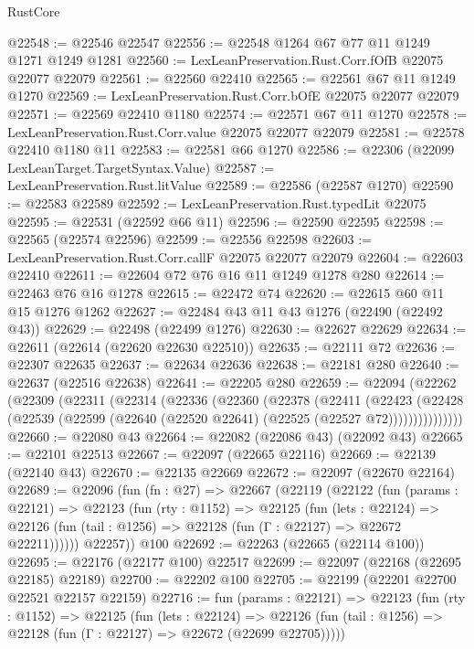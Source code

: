 \begin{lexlean}{RustCore}
\begin{coremodule}
@22548 := @22546 @22547
@22556 := @22548 @1264 @67 @77 @11 @1249 @1271 @1249 @1281
@22560 := LexLeanPreservation.Rust.Corr.fOfB @22075 @22077 @22079
@22561 := @22560 @22410
@22565 := @22561 @67 @11 @1249 @1270
@22569 := LexLeanPreservation.Rust.Corr.bOfE @22075 @22077 @22079
@22571 := @22569 @22410 @1180
@22574 := @22571 @67 @11 @1270
@22578 := LexLeanPreservation.Rust.Corr.value @22075 @22077 @22079
@22581 := @22578 @22410 @1180 @11
@22583 := @22581 @66 @1270
@22586 := @22306 (@22099 LexLeanTarget.TargetSyntax.Value)
@22587 := LexLeanPreservation.Rust.litValue
@22589 := @22586 (@22587 @1270)
@22590 := @22583 @22589
@22592 := LexLeanPreservation.Rust.typedLit @22075
@22595 := @22531 (@22592 @66 @11)
@22596 := @22590 @22595
@22598 := @22565 (@22574 @22596)
@22599 := @22556 @22598
@22603 := LexLeanPreservation.Rust.Corr.callF @22075 @22077 @22079
@22604 := @22603 @22410
@22611 := @22604 @72 @76 @16 @11 @1249 @1278 @280
@22614 := @22463 @76 @16 @1278
@22615 := @22472 @74
@22620 := @22615 @60 @11 @15 @1276 @1262
@22627 := @22484 @43 @11 @43 @1276 (@22490 (@22492 @43))
@22629 := @22498 (@22499 @1276)
@22630 := @22627 @22629
@22634 := @22611 (@22614 (@22620 @22630 @22510))
@22635 := @22111 @72
@22636 := @22307 @22635
@22637 := @22634 @22636
@22638 := @22181 @280
@22640 := @22637 (@22516 @22638)
@22641 := @22205 @280
@22659 := @22094
    (@22262
      (@22309
        (@22311
          (@22314
            (@22336
              (@22360
                (@22378
                  (@22411
                    (@22423
                      (@22428
                        (@22539 (@22599 (@22640 (@22520 @22641) (@22525 (@22527 @72)))))))))))))))
@22660 := @22080 @43
@22664 := @22082 (@22086 @43) (@22092 @43)
@22665 := @22101 @22513
@22667 := @22097 (@22665 @22116)
@22669 := @22139 (@22140 @43)
@22670 := @22135 @22669
@22672 := @22097 (@22670 @22164)
@22689 := @22096
    (fun (fn : @27) =>
    @22667
      (@22119
        (@22122
          (fun (params : @22121) =>
          @22123
            (fun (rty : @1152) =>
            @22125
              (fun (lets : @22124) =>
              @22126 (fun (tail : @1256) => @22128 (fun (Γ : @22127) => @22672 @22211))))))
        @22257))
    @100
@22692 := @22263 (@22665 (@22114 @100))
@22695 := @22176 (@22177 @100) @22517
@22699 := @22097 (@22168 (@22695 @22185) @22189)
@22700 := @22202 @100
@22705 := @22199 (@22201 @22700 @22521 @22157 @22159)
@22716 := fun (params : @22121) =>
  @22123
    (fun (rty : @1152) =>
    @22125
      (fun (lets : @22124) =>
      @22126 (fun (tail : @1256) => @22128 (fun (Γ : @22127) => @22672 (@22699 @22705)))))

\end{coremodule}
\end{lexlean}
